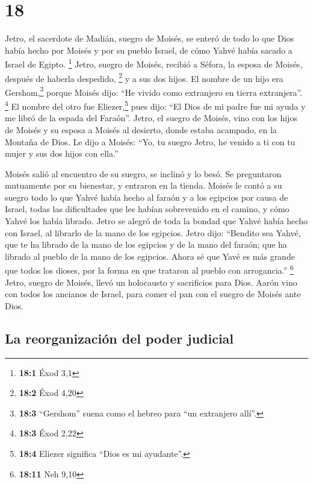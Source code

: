 \hypertarget{section-17}{%
\section{18}\label{section-17}}

 Jetro, el sacerdote de Madián, suegro de Moisés, se
enteró de todo lo que Dios había hecho por Moisés y por su pueblo
Israel, de cómo Yahvé había sacado a Israel de Egipto. \footnote{\textbf{18:1}
  Éxod 3,1}  Jetro, suegro de Moisés, recibió a Séfora, la
esposa de Moisés, después de haberla despedido, \footnote{\textbf{18:2}
  Éxod 4,20}  y a sus dos hijos. El nombre de un hijo era
Gershom,\footnote{\textbf{18:3} ``Gershom'' suena como el hebreo para
  ``un extranjero allí''.} porque Moisés dijo: ``He vivido como
extranjero en tierra extranjera''. \footnote{\textbf{18:3} Éxod 2,22}
 El nombre del otro fue Eliezer,\footnote{\textbf{18:4}
  Eliezer significa ``Dios es mi ayudante''.} pues dijo: ``El Dios de mi
padre fue mi ayuda y me libró de la espada del Faraón''. 
Jetro, el suegro de Moisés, vino con los hijos de Moisés y su esposa a
Moisés al desierto, donde estaba acampado, en la Montaña de Dios.
 Le dijo a Moisés: ``Yo, tu suegro Jetro, he venido a ti
con tu mujer y sus dos hijos con ella.''

 Moisés salió al encuentro de su suegro, se inclinó y lo
besó. Se preguntaron mutuamente por su bienestar, y entraron en la
tienda.  Moisés le contó a su suegro todo lo que Yahvé
había hecho al faraón y a los egipcios por causa de Israel, todas las
dificultades que les habían sobrevenido en el camino, y cómo Yahvé los
había librado.  Jetro se alegró de toda la bondad que
Yahvé había hecho con Israel, al librarlo de la mano de los egipcios.
 Jetro dijo: ``Bendito sea Yahvé, que te ha librado de la
mano de los egipcios y de la mano del faraón; que ha librado al pueblo
de la mano de los egipcios.  Ahora sé que Yavé es más
grande que todos los dioses, por la forma en que trataron al pueblo con
arrogancia.'' \footnote{\textbf{18:11} Neh 9,10}  Jetro,
suegro de Moisés, llevó un holocausto y sacrificios para Dios. Aarón
vino con todos los ancianos de Israel, para comer el pan con el suegro
de Moisés ante Dios.

\hypertarget{la-reorganizaciuxf3n-del-poder-judicial}{%
\subsection{La reorganización del poder
judicial}\label{la-reorganizaciuxf3n-del-poder-judicial}}

